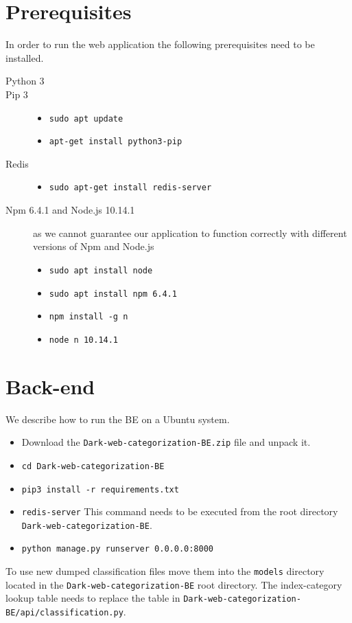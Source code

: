 \begin{appendices}
\section{Prerequisites} \label{dixAppPrerequisites}
In order to run the web application the following prerequisites need to be installed.
\begin{description}
    \item[Python 3] \hfill
    \item[Pip 3] \hfill 
        \begin{itemize}
	 \item \texttt{sudo apt update}
            \item \texttt{apt-get install python3-pip}
        \end{itemize}
    \item[Redis] \hfill 
        \begin{itemize}
            \item \texttt{sudo apt-get install redis-server}
        \end{itemize}
    \item[Npm 6.4.1 and Node.js 10.14.1] as we cannot guarantee our application to function correctly with different versions of Npm and Node.js
        \begin{itemize}
            \item \texttt{sudo apt install node}
            \item \texttt{sudo apt install npm 6.4.1}
            \item \texttt{npm install -g n}
            \item \texttt{node n 10.14.1}
        \end{itemize}
\end{description}

\section{Back-end}
We describe how to run the BE on a Ubuntu system.
\begin{itemize}
    \item Download the \texttt{Dark-web-categorization-BE.zip} file and unpack it.
    \item \texttt{cd Dark-web-categorization-BE}
    \item \texttt{pip3 install -r requirements.txt}
    \item \texttt{redis-server} This command needs to be executed from the root directory \texttt{Dark-web-categorization-BE}.
    \item \texttt{python manage.py runserver 0.0.0.0:8000}
\end{itemize}
To use new dumped classification files move them into the \texttt{models} directory located in the \texttt{Dark-web-categorization-BE} root directory. The index-category lookup table needs to replace the table in \texttt{Dark-web-categorization-BE/api/classification.py}.


\end{appendices}
